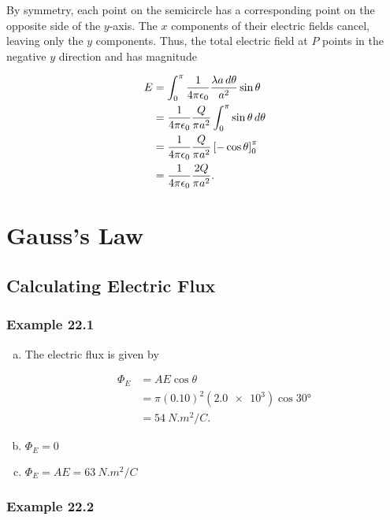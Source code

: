 \documentclass{article}
\begin{document}
By symmetry, each point on the semicircle has a corresponding point on the opposite side of the $y$-axis. The $x$ components of their electric fields cancel, leaving only the $y$ components. Thus, the total electric field at $P$ points in the negative $y$ direction and has magnitude

\begin{align*}
  E & = \int_0^\pi \frac{1}{4 \pi \epsilon_0} \frac{\lambda a \, d\theta}{a^2} \sin \theta \\
    & = \frac{1}{4 \pi \epsilon_0} \frac{Q}{\pi a^2} \int_0^\pi \sin \theta \, d\theta     \\
    & = \frac{1}{4 \pi \epsilon_0} \frac{Q}{\pi a^2} \left[ -\cos \theta \right]_0^\pi     \\
    & = \frac{1}{4 \pi \epsilon_0} \frac{2Q}{\pi a^2}.
\end{align*}

\section{Gauss's Law}

\setcounter{subsection}{1}
\subsection{Calculating Electric Flux}

\subsubsection{Example 22.1}

\begin{enumerate}[a)]
  \item The electric flux is given by

        \begin{align*}
          \Phi_E & = A E \cos \theta                          \\
                 & = \pi (0.10)^2 (\num{2.0e3}) \cos \ang{30} \\
                 & = \qty{54}{N.m^2/C}.
        \end{align*}

  \item $\Phi_E = 0$

  \item $\Phi_E = A E = \qty{63}{N.m^2/C}$
\end{enumerate}

\subsubsection{Example 22.2}
\end{document}

